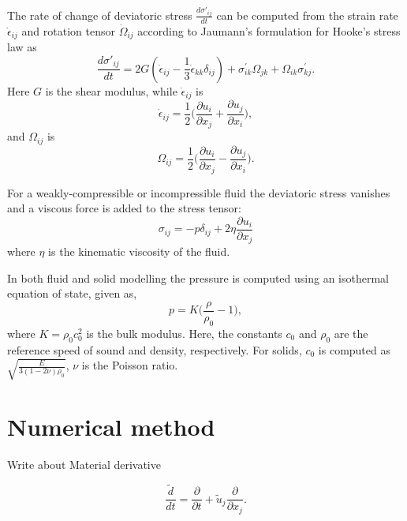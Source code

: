 \documentclass[preprint,12pt]{elsarticle}
\begin{document}
The rate of change of deviatoric stress $\frac{d \sigma'_{ij}}{dt}$ can be
computed from the strain rate $\dot{\epsilon}_{ij}$ and rotation tensor
$\dot{\Omega}_{ij}$ according to Jaumann's formulation for Hooke's stress law
as
\begin{equation}
  \label{eq:jaumann-stress-rate}
  \frac{d \sigma'_{ij}}{dt} = 2G (\dot{\epsilon}_{ij} - \frac{1}{3}
  \dot{\epsilon}_{kk} \delta_{ij}) + \sigma^{'}_{ik}  \Omega_{jk} +
  \Omega_{ik} \sigma^{'}_{kj}.
\end{equation}
Here $G$ is the shear modulus, while $\dot{\epsilon}_{ij}$ is
\begin{equation}
  \label{eq:strain-tensor}
  \dot{\epsilon}_{ij} = \frac{1}{2} \bigg(\frac{\partial u_i}{\partial x_j} +
  \frac{\partial u_j}{\partial x_i} \bigg),
\end{equation}
and $\Omega_{ij}$ is
\begin{equation}
  \label{eq:rotational-tensor}
  \Omega_{ij} = \frac{1}{2} \bigg(\frac{\partial u_i}{\partial x_j} -
  \frac{\partial u_j}{\partial x_i} \bigg).
\end{equation}

For a weakly-compressible or incompressible fluid the deviatoric stress
vanishes and a viscous force is added to the stress tensor:
\begin{equation}
  \label{eq:fluid-stress-decomposition}
  \sigma_{ij} = - p \delta_{ij} + 2 \eta \frac{\partial u_i}{\partial x_j}
\end{equation}
where $\eta$ is the kinematic viscosity of the fluid.

In both fluid and solid modelling the pressure is computed using an
isothermal equation of state, given as,
\begin{equation}
  \label{eq:pressure-equation}
  p = K \bigg(\frac{\rho}{\rho_{0}} - 1 \bigg),
\end{equation}
where $K = \rho_{0} c_0^2$ is the bulk modulus. Here, the constants $c_0$ and
$\rho_0$ are the reference speed of sound and density, respectively. For solids,
$c_0$ is computed as $\sqrt{\frac{E}{3 (1 - 2 \nu)\rho_{0}}}$, $\nu$ is the
Poisson ratio.


\section{Numerical method}

Write about Material derivative

\begin{equation}
  \label{eq:modified-material-derivative}
  \frac{\tilde{d} }{d t} = \frac{\partial }{\partial t} +
  \tilde{u}_j \frac{\partial }{\partial x_j}.
\end{equation}
\end{document}
